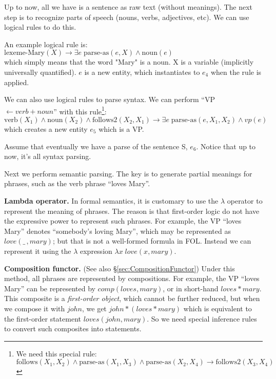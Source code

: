 Up to now, all we have is a sentence as raw text (without meanings).  The next step is to recognize parts of speech (nouns, verbs, adjectives, etc). We can use logical rules to do this.

An example logical rule is:\\
\hspace*{1cm} $\mbox{lexeme-Mary}(X) \rightarrow \exists e \; \mbox{parse-as}(e, X) \wedge \mbox{noun}(e)$\\
which simply means that the word "Mary" is a noun. X is a variable (implicitly universally quantified). $e$ is a new entity, which instantiates to $e_4$ when the rule is applied.

We can also use logical rules to parse syntax. We can perform ``VP $\leftarrow verb + noun$'' with this rule\footnote{We need this special rule:\\
\hspace*{1cm} $\mbox{follows}(X_1, X_2) \wedge \mbox{parse-as}(X_1, X_3) \wedge \mbox{parse-as}(X_2, X_4) \rightarrow \mbox{follows2}(X_3, X_4)$ }:\\
\hspace*{1cm} $\mbox{verb}(X_1) \wedge \mbox{noun}(X_2) \wedge \mbox{follows2}(X_2, X_1) \rightarrow \exists e \; \mbox{parse-as}(e, X_1, X_2) \wedge vp(e)$\\
which creates a new entity $e_5$ which is a VP.

Assume that eventually we have a parse of the sentence S, $e_6$. Notice that up to now, it's all syntax parsing.

Next we perform semantic parsing.  The key is to generate partial meanings for phrases, such as the verb phrase ``loves Mary''.

\textbf{Lambda operator.}  In formal semantics, it is customary to use the $\lambda$ operator to represent the meaning of phrases.  The reason is that first-order logic do not have the expressive power to represent such phrases.  For example, the VP ``loves Mary'' denotes ``somebody's loving Mary'', which may be represented as $love(\_ \,,mary)$; but that is not a well-formed formula in FOL.  Instead we can represent it using the $\lambda$ expression $\lambda x \; love(x,mary)$.

\textbf{Composition functor.}  (See also \S\ref{sec:CompositionFunctor})  Under this method, all phrases are represented by compositions.  For example, the VP ``loves Mary'' can be represented by $comp(loves,mary)$, or in short-hand $loves * mary$.  This composite is a \textit{first-order object}, which cannot be further reduced, but when we compose it with $john$, we get $john * (loves * mary)$ which is equivalent to the first-order statement $loves(john,mary)$.  So we need special inference rules to convert such composites into statements.

